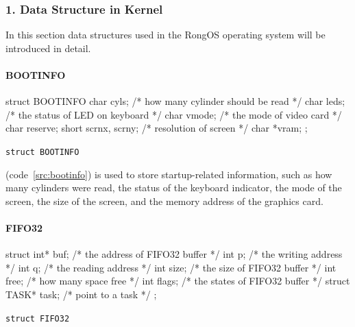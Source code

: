 \documentclass{swfcthesis}
\begin{document}
\iffalse %
\subsubsection{1. Data Structure in Kernel}
In this section data structures used in the RongOS operating system will be introduced in
detail.

\paragraph{BOOTINFO}

\begin{listing}[H]
  \begin{codeblock}
\begin{ccode}
struct BOOTINFO
{
  char cyls;          /* how many cylinder should be read */
  char leds;          /* the status of LED on keyboard */
  char vmode;         /* the mode of video card */
  char reserve;
  short scrnx, scrny; /* resolution of screen */
  char *vram;
};
\end{ccode}
  \end{codeblock}
  \caption{\texttt{struct BOOTINFO}}\label{src:bootinfo}
\end{listing}

(code~\ref{src:bootinfo}) is used to store startup-related
information, such as how many cylinders were read, the status of the keyboard indicator,
the mode of the screen, the size of the screen, and the memory address of the graphics
card.


\paragraph{FIFO32}

\begin{listing}[H]
  \begin{codeblock}
\begin{ccode}
struct 
{ 
  int* buf;          /* the address of FIFO32 buffer */
  int p;             /* the writing address */
  int q;             /* the reading address */
  int size;          /* the size of FIFO32 buffer */
  int free;          /* how many space free */
  int flags;         /* the states of FIFO32 buffer */
  struct TASK* task; /* point to a task */ 
};
\end{ccode}
  \end{codeblock}
  \caption{\texttt{struct FIFO32}}\label{src:FIFO32}
\end{listing}
\end{document}
